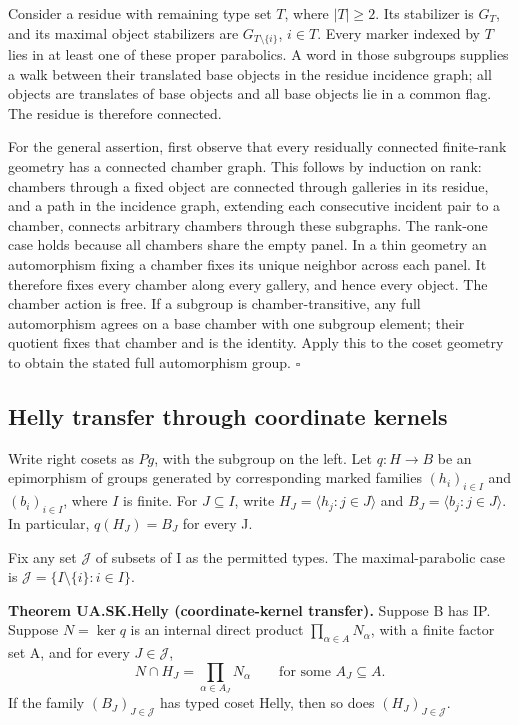 Consider a residue with remaining type set \(T\), where \(|T|\geq2\).
Its stabilizer is \(G_T\), and its maximal object stabilizers are
\(G_{T\setminus\{i\}}\), \(i\in T\). Every marker indexed by \(T\) lies
in at least one of these proper parabolics. A word in those subgroups
supplies a walk between their translated base objects in the residue
incidence graph; all objects are translates of base objects and all base
objects lie in a common flag. The residue is therefore connected.

For the general assertion, first observe that every residually connected
finite-rank geometry has a connected chamber graph. This follows by
induction on rank: chambers through a fixed object are connected through
galleries in its residue, and a path in the incidence graph, extending
each consecutive incident pair to a chamber, connects arbitrary chambers
through these subgraphs. The rank-one case holds because all chambers
share the empty panel. In a thin geometry an automorphism fixing a
chamber fixes its unique neighbor across each panel. It therefore fixes
every chamber along every gallery, and hence every object. The chamber
action is free. If a subgroup is chamber-transitive, any full
automorphism agrees on a base chamber with one subgroup element; their
quotient fixes that chamber and is the identity. Apply this to the coset
geometry to obtain the stated full automorphism group. \(\square\)

\subsection{Helly transfer through coordinate
kernels}\label{helly-transfer-through-coordinate-kernels}

Write right cosets as \(P g\), with the subgroup on the left. Let
\(q:H\to B\) be an epimorphism of groups generated by corresponding
marked families \((h_i)_{i\in I}\) and \((b_i)_{i\in I}\), where \(I\)
is finite. For \(J\subseteq I\), write \(H_J=\langle h_j:j\in J\rangle\)
and \(B_J=\langle b_j:j\in J\rangle\). In particular, \(q(H_J)=B_J\) for
every J.

Fix any set \(\mathcal J\) of subsets of I as the permitted types. The
maximal-parabolic case is \(\mathcal J=\{I\setminus\{i\}:i\in I\}\).

\textbf{Theorem UA.SK.Helly (coordinate-kernel transfer).} Suppose B has
IP. Suppose \(N=\ker q\) is an internal direct product
\(\prod_{\alpha\in A}N_\alpha\), with a finite factor set A, and for
every \(J\in\mathcal J\), \[
 N\cap H_J=\prod_{\alpha\in A_J}N_\alpha
 \qquad\text{for some }A_J\subseteq A.
 \tag{H1}
\] If the family \((B_J)_{J\in\mathcal J}\) has typed coset Helly, then
so does \((H_J)_{J\in\mathcal J}\).

